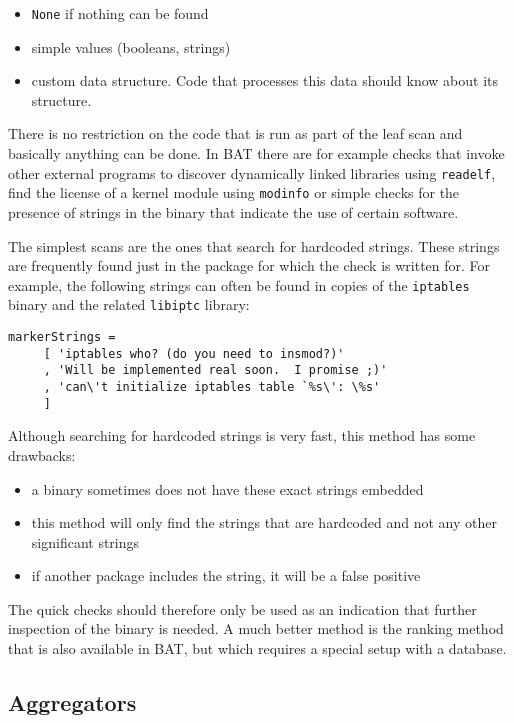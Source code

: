 \documentclass[10pt,a4paper]{article}
\begin{document}
\begin{itemize}
\item \texttt{None} if nothing can be found
\item simple values (booleans, strings)
\item custom data structure. Code that processes this data should know about
its structure.
\end{itemize}

There is no restriction on the code that is run as part of the leaf scan and
basically anything can be done. In BAT there are for example checks that invoke
other external programs to discover dynamically linked libraries using
\texttt{readelf}, find the license of a kernel module using \texttt{modinfo}
or simple checks for the presence of strings in the binary that indicate the
use of certain software.

The simplest scans are the ones that search for hardcoded strings. These strings
are frequently found just in the package for which the check is written for. For
example, the following strings can often be found in copies of the
\texttt{iptables} binary and the related \texttt{libiptc} library:

\begin{verbatim}
markerStrings =
     [ 'iptables who? (do you need to insmod?)'
     , 'Will be implemented real soon.  I promise ;)'
     , 'can\'t initialize iptables table `%s\': \%s'
     ]
\end{verbatim}

Although searching for hardcoded strings is very fast, this method has some
drawbacks:

\begin{itemize}
\item a binary sometimes does not have these exact strings embedded
\item this method will only find the strings that are hardcoded and not any
other significant strings
\item if another package includes the string, it will be a false positive
\end{itemize}

The quick checks should therefore only be used as an indication that further
inspection of the binary is needed. A much better method is the ranking method
that is also available in BAT, but which requires a special setup with a
database.

\subsection{Aggregators}
\end{document}
